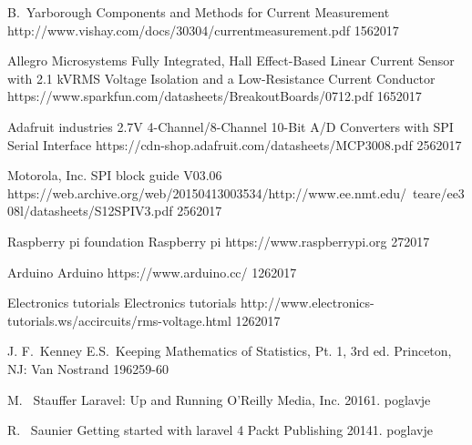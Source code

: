 \documentclass[12pt,a4paper,titlepage,openany]{report}
\begin{document}
 \begin{thebibliography}{99}
\thispagestyle{fancy}

\spletniVirZAvtorjem
    {B.~Yarborough}
    {Components and Methods for Current Measurement}
    {http://www.vishay.com/docs/30304/currentmeasurement.pdf}
    {15}{6}{2017}

\spletniVirZAvtorjem
    {Allegro Microsystems}
    {Fully Integrated, Hall Effect-Based Linear Current Sensor with 2.1 kVRMS Voltage Isolation and a Low-Resistance Current Conductor}
    {https://www.sparkfun.com/datasheets/BreakoutBoards/0712.pdf}
    {16}{5}{2017}

\spletniVirZAvtorjem
    {Adafruit industries}
    {2.7V 4-Channel/8-Channel 10-Bit A/D Converters with SPI Serial Interface}
    {https://cdn-shop.adafruit.com/datasheets/MCP3008.pdf}
    {25}{6}{2017}

\spletniVirZAvtorjem
    {Motorola, Inc.}
    {SPI block guide V03.06}
    {https://web.archive.org/web/20150413003534/http://www.ee.nmt.edu/~teare/ee308l/datasheets/S12SPIV3.pdf}
    {25}{6}{2017}


\spletniVirZAvtorjem
    {Raspberry pi foundation}
    {Raspberry pi}
    {https://www.raspberrypi.org}
    {2}{7}{2017}

\spletniVirZAvtorjem
    {Arduino}
    {Arduino}
    {https://www.arduino.cc/}
    {12}{6}{2017}


\spletniVirZAvtorjem
    {Electronics tutorials}
    {Electronics tutorials}
    {http://www.electronics-tutorials.ws/accircuits/rms-voltage.html}
    {12}{6}{2017}


  \clanekVRevijiVecAvtorjev
    {J. F.~Kenney }{E.S.~Keeping}
    {Mathematics of Statistics, Pt. 1, 3rd ed.}
   { Princeton, NJ: Van Nostrand}
   {1962}{59-60}

  \clanekVRevijiVecAvtorjev
    {M.~ Stauffer}
    {Laravel: Up and Running}
   {O'Reilly Media, Inc.}
   {2016}{1. poglavje}


  \clanekVRevijiVecAvtorjev
    {R.~ Saunier}
    {Getting started with laravel 4}
   {Packt Publishing}
   {2014}{1. poglavje}


\end{thebibliography}
\newpage
\end{document}

